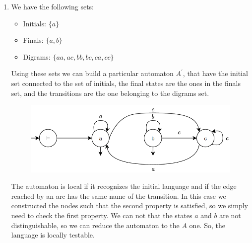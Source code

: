 \documentclass[12pt, a4paper]{report}
\newtheorem[style=M,bodystyle=\normalfont]{theorem}{Theorem}
\newtheorem[style=M,bodystyle=\normalfont]{corollary}{Corollary}
\newtheorem[style=M,bodystyle=\normalfont]{lemma}{Lemma}
\newtheorem[style=M,bodystyle=\normalfont]{definition}{Definition}
\begin{document}
\begin{enumerate}
        \item We have the following sets: 
            \begin{itemize}
                \item Initials: $\{a\}$
                \item Finals: $\{a,b\}$
                \item Digrams: $\{aa,ac,bb,bc,ca,cc\}$
            \end{itemize}
            Using these sets we can build a particular automaton $A^{'}$, that have the initial set connected to the set of initials, the final states are the ones in the finals set, and the transitions are the
            one belonging to the digrams set. 
            \begin{figure}[H]
                \centering
                \includegraphics[width=0.75\linewidth]{images/FSA6.png}
            \end{figure}
            The automaton is local if it recognizes the initial language and if the edge reached by an arc has the same name of the transition. In this case we constructed the nodes such that the second property is 
            satisfied, so we simply need to check the first property. We can not that the states $a$ and $b$ are not distinguishable, so we can reduce the automaton to the $A$ one. So, the language is locally testable. 
    \end{enumerate}

    \newpage
\end{document}
